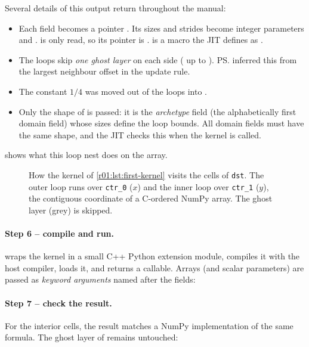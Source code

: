
Several details of this output return throughout the manual:
\begin{itemize}
  \item Each field becomes a pointer . Its sizes and strides become
        integer parameters  and .
         is only read, so its pointer is .  is a
        macro the JIT defines as .
  \item The loops skip \emph{one ghost layer} on each side ( up to
        ). \ps{} inferred this from the largest neighbour offset
        in the update rule.
  \item The constant $1/4$ was moved out of the loops into .
  \item Only the shape of  is passed: it is the \emph{archetype} field (the
        alphabetically first domain field) whose sizes define the loop bounds. All domain
        fields must have the same shape, and the JIT checks this when the kernel is
        called.
\end{itemize}
 shows what this loop nest does on the array.

\begin{figure}[htbp]
  \centering
  
  \caption[How the first kernel traverses the array]{How the kernel of \cref{r01:lst:first-kernel} visits the cells of \texttt{dst}. The outer loop runs over \texttt{ctr\_0} ($x$) and the inner loop over \texttt{ctr\_1} ($y$), the contiguous coordinate of a C-ordered NumPy array. The ghost layer (grey) is skipped.}
  \label{r01:fig:sweep}
\end{figure}

\paragraph{Step 6 -- compile and run.}
 wraps the kernel in a small C++ Python extension module,
compiles it with the host compiler, loads it, and returns a callable. Arrays (and
scalar parameters) are passed as \emph{keyword arguments} named after the fields:

\paragraph{Step 7 -- check the result.}
For the interior cells, the result matches a NumPy implementation of the same formula.
The ghost layer of  remains untouched:

